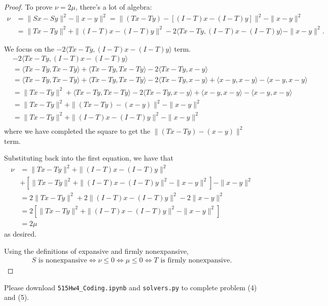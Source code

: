 \documentclass[11pt]{amsart}
\begin{document}
\begin{enumerate}
\begin{enumerate}
\begin{proof}
  To prove $\nu = 2\mu$, there's a lot of algebra:
  \begin{align*}
    \nu &=\|Sx - Sy\|^2 - \|x-y\|^2
    = \|(Tx - Ty) - [(I - T)x - (I - T)y]\|^2  - \|x-y\|^2 \\    
    &= \|Tx - Ty\|^2 + \|(I - T)x - (I - T)y\|^2
      - 2\langle Tx - Ty, (I - T)x - (I - T)y\rangle - \|x-y\|^2.
  \end{align*}

  We focus on the $-2\langle Tx - Ty, (I - T)x - (I - T)y\rangle$ term.
  \begin{align*}
    &-2\langle Tx - Ty, (I - T)x - (I - T)y\rangle \\
    &= \langle Tx - Ty, Tx - Ty \rangle + \langle Tx - Ty, Tx - Ty \rangle
      - 2\langle Tx - Ty, x - y \rangle \\
    &= \langle Tx - Ty, Tx - Ty \rangle + \langle Tx - Ty, Tx - Ty \rangle
      - 2\langle Tx - Ty, x - y \rangle + \langle x - y, x - y \rangle - \langle x - y, x - y \rangle \\
    &= \| Tx - Ty \|^2 + \langle Tx - Ty, Tx - Ty \rangle
      - 2\langle Tx - Ty, x - y \rangle + \langle x - y, x - y \rangle - \langle x - y, x - y \rangle \\
    &= \| Tx - Ty \|^2 + \| (Tx - Ty) - (x-y) \|^2 - \| x - y \|^2 \\
    &= \| Tx - Ty \|^2 + \| (I - T)x - (I- T)y\|^2 - \| x - y \|^2 \\
  \end{align*}
  where we have completed the square to get the $\| (Tx - Ty) - (x-y) \|^2$
  term.

  Substituting back into the first equation, we have that
  \begin{align*}
    \nu
    &= \|Tx - Ty\|^2 + \|(I - T)x - (I - T)y\|^2 \\
    &+ \left[\| Tx - Ty \|^2 + \| (I - T)x - (I- T)y\|^2 - \| x - y \|^2\right] - \|x-y\|^2 \\
    &= 2\|Tx - Ty\|^2 + 2\|(I - T)x - (I - T)y\|^2 - 2\| x - y \|^2 \\
    &= 2\left[\|Tx - Ty\|^2 + \|(I - T)x - (I - T)y\|^2 - \| x - y \|^2\right] \\
    &= 2\mu
  \end{align*}
  as desired.

  Using the definitions of expansive and firmly nonexpansive,
  \begin{align*}
    \text{$S$ is nonexpansive}
    \Leftrightarrow \nu \leq 0
    \Leftrightarrow \mu \leq 0
    \Leftrightarrow \text{$T$ is firmly nonexpansive.}
  \end{align*}
\end{proof}

\end{enumerate}

\end{enumerate}
\newpage
{}
\vskip 8pt \noindent
Please download \texttt{515Hw4\_Coding.ipynb} and \texttt{solvers.py} to complete problem (4) and (5).
\vskip 8pt
\end{document}
